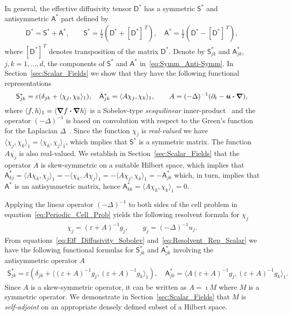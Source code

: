 \documentclass[leqno,onefignum,onetabnum]{siamltex1213}
\newcommand{\secref}[1]{Section~\ref{#1}}
\newcommand{\Dm}{\mathsf{D}}
\newcommand{\Sm}{\mathsf{S}}
\newcommand{\Am}{\mathsf{A}}
\newcommand\bnabla{\mbox{\boldmath${\nabla}$}}
\providecommand\bcdot{\boldsymbol{\cdot}}
\newcommand{\vecu}{\boldsymbol{u}}
\begin{document}
In general, the effective diffusivity tensor $\Dm^*$ has a symmetric
$\Sm^*$ and antisymmetric $\Am^*$ part defined by 
%
\begin{align}\label{eq:Symm_Anti-Symm}
  \Dm^*=\Sm^*+\Am^*,\qquad
  \Sm^*=\frac{1}{2}\left(\Dm^*+[\Dm^*]^{\,T}\right), \quad
  \Am^*=\frac{1}{2}\left(\Dm^*-[\Dm^*]^{\,T}\right),
\end{align}
%
where $[\Dm^*]^{\,T}$ denotes transposition of the matrix
$\Dm^*$. Denote by $\Sm^*_{jk}$ and $\Am^*_{jk}$, $j,k=1,\ldots,d$, the
components of $\Sm^*$ and $\Am^*$ in~\eqref{eq:Symm_Anti-Symm}. In
\secref{sec:Scalar_Fields} we show that they have the following
functional representations~\cite{Pavliotis:PHD_Thesis} 
%
\begin{align}\label{eq:Eff_Diffusivity_Sobolev}
  \Sm^*_{jk}=\varepsilon(\delta_{jk}+\langle\chi_j,\chi_k\rangle_1),
  \quad
  \Am^*_{jk}=\langle A\chi_j,\chi_k\rangle_1,
  \qquad
  A=(-\Delta)^{-1}(\partial_t-\vecu \bcdot\bnabla),
\end{align}
%
where $\langle f,h\rangle_1=\langle\bnabla f\bcdot\bnabla h\rangle$ is a Sobelov-type
\emph{sesquilinear} inner-product~\cite{McOwen:2003:PDE} and the
operator $(-\Delta)^{-1}$ is based on convolution with respect to the
Green's function for the Laplacian $\Delta$~\cite{Stakgold:BVP:2000}.  
Since the function $\chi_j$ is
\emph{real-valued} we have $\langle\chi_j,\chi_k\rangle_1=\langle\chi_k,\chi_j\rangle_1$, which implies that
$\Sm^*$ is a symmetric matrix. The function $A\chi_j$ is also
real-valued. We establish in \secref{sec:Scalar_Fields} that the
operator $A$ is skew-symmetric on a suitable Hilbert space, which
implies that
$\Am^*_{kj}=\langle A\chi_k,\chi_j\rangle_1=-\langle\chi_k,A\chi_j\rangle_1=-\langle A\chi_j,\chi_k\rangle_1=-\Am^*_{jk}$
which, in turn, implies that $\Am^*$ is an antisymmetric matrix, hence
$\Am^*_{kk}=\langle A\chi_k,\chi_k\rangle_1=0$.  



Applying the linear operator $(-\Delta)^{-1}$ to both sides of the cell
problem in equation~\eqref{eq:Periodic_Cell_Prob} yields the following
resolvent formula for $\chi_j$
%
\begin{align}\label{eq:Resolvent_Rep_Scalar}
  \chi_j=(\varepsilon+A)^{-1}g_j, \qquad 
  g_j=(-\Delta)^{-1}u_j.
\end{align}
%
From equations~\eqref{eq:Eff_Diffusivity_Sobolev}
and~\eqref{eq:Resolvent_Rep_Scalar} we have the following functional
formulas for $\Sm^*_{jk}$ and $\Am^*_{jk}$ involving the
antisymmetric operator $A$
%
\begin{align}\label{eq:Eff_Diff_Resolvent_Sobolev}
 \Sm^*_{jk}=\varepsilon\left(\delta_{jk}
  +\langle(\varepsilon+A)^{-1}g_j,(\varepsilon+A)^{-1}g_k\rangle_1\right), 
  \quad
 \Am^*_{jk}=\langle A(\varepsilon+A)^{-1}g_j,(\varepsilon+A)^{-1}g_k\rangle_1.
\end{align}
%
Since $A$ is a skew-symmetric operator, it can be written as $A=\imath M$
where $M$ is a symmetric operator. We demonstrate in
\secref{sec:Scalar_Fields} that $M$ is \emph{self-adjoint} on an
appropriate densely defined subset of a Hilbert space.
\end{document}
